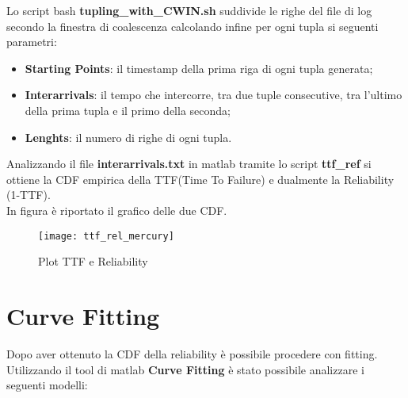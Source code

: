 Lo script bash \textbf{tupling\_with\_CWIN.sh} suddivide le righe del file di log
secondo la finestra di coalescenza calcolando infine per ogni tupla si seguenti parametri:

\begin{itemize}
  \item \textbf{Starting Points}: il timestamp della prima riga di ogni tupla generata;
  \item \textbf{Interarrivals}: il tempo che intercorre, tra due tuple consecutive, tra l'ultimo
  della prima tupla e il primo della seconda;
  \item \textbf{Lenghts}: il numero di righe di ogni tupla.
\end{itemize}

Analizzando il file \textbf{interarrivals.txt} in matlab tramite lo script \textbf{ttf\_ref}
si ottiene la CDF empirica della TTF(Time To Failure) e dualmente la Reliability (1-TTF).\\
In figura è riportato il grafico delle due CDF.

\begin{figure}[!htbp]
  \texttt{[image: ttf\_rel\_mercury]}
  \caption{Plot TTF e Reliability}
  \label{ttf_rel_mercury}
\end{figure}

\section{Curve Fitting}

Dopo aver ottenuto la CDF della reliability è possibile procedere con fitting.\\
Utilizzando il tool di matlab \textbf{Curve Fitting} è stato possibile
analizzare i seguenti modelli:

\clearpage

